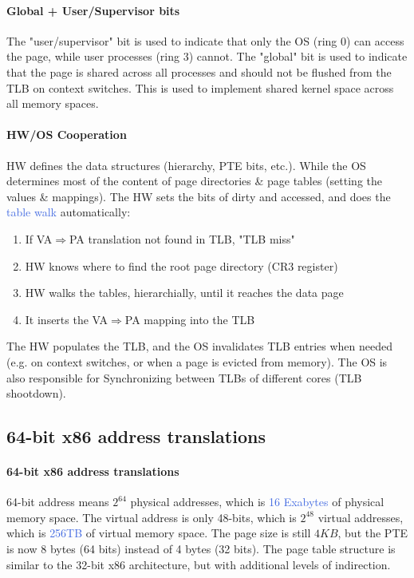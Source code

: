 \documentclass[openany,12pt]{book}
\newcommand{\blue}[1]{\textcolor{RoyalBlue}{#1}}
\begin{document}
\paragraph{Global + User/Supervisor bits} The "user/supervisor" bit is used to indicate that only the OS (ring 0) can access the page, while user processes (ring 3) cannot. The "global" bit is used to indicate that the page is shared across all processes and should not be flushed from the TLB on context switches. This is used to implement shared kernel space across all memory spaces. 


\paragraph{HW/OS Cooperation} HW defines the data structures (hierarchy, PTE bits, etc.). While the OS determines most of the content of page directories \& page tables (setting the values \& mappings). The HW sets the bits of dirty and accessed, and does the \blue{table walk} automatically:
\begin{enumerate}
  \item If VA\(\Longrightarrow\)PA translation not found in TLB, "TLB miss"
  \item HW knows where to find the root page directory (CR3 register)
  \item HW walks the tables, hierarchially, until it reaches the data page
  \item It inserts the VA\(\Longrightarrow\)PA mapping into the TLB
\end{enumerate}
The HW populates the TLB, and the OS invalidates TLB entries when needed (e.g. on context switches, or when a page is evicted from memory). The OS is also responsible for Synchronizing between TLBs of different cores (TLB shootdown).


\subsection*{64-bit x86 address translations}
\paragraph{64-bit x86 address translations} 64-bit address means \(2^{64}\) physical addresses, which is \blue{16 Exabytes} of physical memory space. The virtual address is only 48-bits, which is \(2^{48}\) virtual addresses, which is \blue{256TB} of virtual memory space. The page size is still \(4KB\), but the PTE is now 8 bytes (64 bits) instead of 4 bytes (32 bits). The page table structure is similar to the 32-bit x86 architecture, but with additional levels of indirection.
\end{document}
